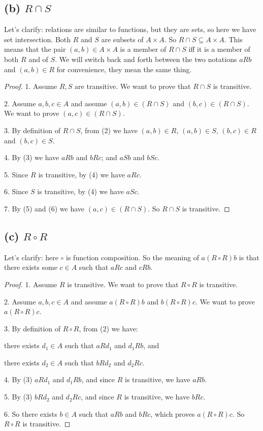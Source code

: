 \documentclass[14pt]{extarticle}
\begin{document}
\subsection{(b) $R \cap S$} 
Let's clarify: relations are similar to functions, but they are sets, so here we have set intersection. Both $R$ and $S$ are subsets of $A \times A$. So $R \cap S \subseteq A \times A$. This means that the pair $(a, b) \in A \times A$ is a member of $R \cap S$ iff it is a member of both $R$ and of $S$. We will switch back and forth between the two notations $a R b$ and $(a, b) \in R$ for convenience, they mean the same thing.
\begin{proof}
1. Assume $R, S$ are transitive. We want to prove that $R \cap S$ is transitive.

2. Assume $a, b, c \in A$ and assume $(a,b) \in (R \cap S)$ and $(b,c) \in (R \cap S)$. We want to prove $(a,c) \in (R \cap S)$.

3. By definition of $R \cap S$, from (2) we have $(a,b) \in R$, $(a,b) \in S$, $(b,c) \in R$ and $(b,c) \in S$.

4. By (3) we have $a R b$ and $b R c$; and $a S b$ and $b S c$.

5. Since $R$ is transitive, by (4) we have $a R c$.

6. Since $S$ is transitive, by (4) we have $a S c$.

7. By (5) and (6) we have $(a,c) \in (R \cap S)$. So $R \cap S$ is transitive.
\end{proof}
\subsection{(c) $R \circ R$} 
Let's clarify: here $\circ$ is function composition. So the meaning of $a (R \circ R) b$ is that there exists some $c \in A$ such that $a R c$ and $c R b$.
\begin{proof}
1. Assume $R$ is transitive. We want to prove that $R \circ R$ is transitive.

2. Assume $a, b, c \in A$ and assume $a (R \circ R) b$ and $b (R \circ R) c$. We want to prove $a (R \circ R) c$.

3. By definition of $R \circ R$, from (2) we have:

there exists $d_1 \in A$ such that $a R d_1$ and $d_1 R b$, and

there exists $d_2 \in A$ such that $b R d_2$ and $d_2 R c$.

4. By (3) $a R d_1$ and $d_1 R b$, and since $R$ is transitive, we have $a R b$.

5. By (3) $b R d_2$ and $d_2 R c$, and since $R$ is transitive, we have $b R c$.

6. So there exists $b \in A$ such that $a R b$ and $b R c$, which proves $a (R \circ R) c$. So $R \circ R$ is transitive.
\end{proof}
\end{document}
